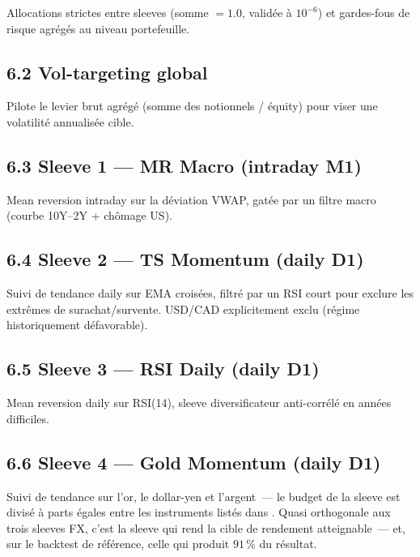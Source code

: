 \documentclass[11pt, a4paper]{scrartcl}
\begin{document}
Allocations strictes entre sleeves (somme $= 1.0$, validée à $10^{-6}$) et
gardes-fous de risque agrégés au niveau portefeuille.



\subsection*{6.2 Vol-targeting global}

Pilote le levier brut agrégé (somme des notionnels / équity) pour viser une
volatilité annualisée cible.



\subsection*{6.3 Sleeve 1 --- MR Macro (intraday M1)}

Mean reversion intraday sur la déviation VWAP, gatée par un filtre macro
(courbe 10Y--2Y + chômage US).



\clearpage

\subsection*{6.4 Sleeve 2 --- TS Momentum (daily D1)}

Suivi de tendance daily sur EMA croisées, filtré par un RSI court pour exclure
les extrêmes de surachat/survente. USD/CAD explicitement exclu (régime
historiquement défavorable).



\subsection*{6.5 Sleeve 3 --- RSI Daily (daily D1)}

Mean reversion daily sur RSI(14), sleeve diversificateur anti-corrélé en années
difficiles.



\subsection*{6.6 Sleeve 4 --- Gold Momentum (daily D1)}

Suivi de tendance sur l'or, le dollar-yen et l'argent~--- le budget de la sleeve est
divisé à parts égales entre les instruments listés dans .
Quasi orthogonale aux trois sleeves FX, c'est la sleeve qui rend la cible de rendement
atteignable~--- et, sur le backtest de référence, celle qui produit $91\,\%$ du
résultat.
\end{document}
